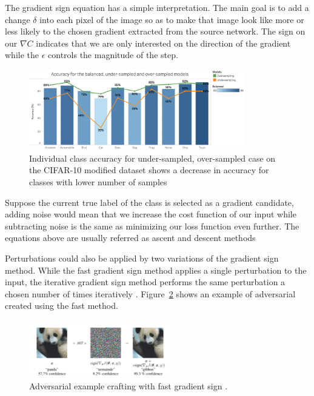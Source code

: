 \documentclass[runningheads,a4paper]{llncs}
\begin{document}
The gradient sign equation has a simple interpretation. The main goal is to add a change $\delta$ into each pixel of the image so as to make that image look like more or less likely to the chosen gradient extracted from the source network. The sign on our $\nabla C$ indicates that we are only interested on the direction of the gradient while the $\epsilon$ controls the magnitude of the step.

\begin{figure}
	\centering
	\includegraphics[height=3.5cm]{graph_non_pert.png}
	\caption{Individual class accuracy for under-sampled, over-sampled case on the CIFAR-10 modified dataset shows a decrease in accuracy for classes with lower number of samples}
	\label{fig:acc_graph}
\end{figure}

Suppose the current true label of the class is selected as a gradient candidate, adding noise would mean that we increase the cost function of our input while subtracting noise is the same as minimizing our loss function even further. 
The equations above are usually referred as ascent and descent methods

Perturbations could also be applied by two variations of the gradient sign method. While the fast gradient sign method applies a single perturbation to the input, the iterative gradient sign method performs the same perturbation a chosen number of times iteratively \cite{goodfellow2014}. Figure~\ref{fig:fgsm_craft} shows an example of adversarial created using the fast method.



\begin{figure}
	\centering
	\includegraphics[height=2.5cm]{panda.png}
	\caption{Adversarial example crafting with fast gradient sign \cite{goodfellow2014}.}
	\label{fig:fgsm_craft}
\end{figure}
\end{document}
